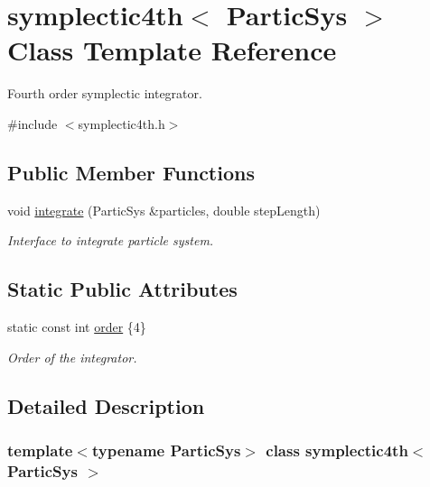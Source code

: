 \hypertarget{classsymplectic4th}{}\section{symplectic4th$<$ Partic\+Sys $>$ Class Template Reference}
\label{classsymplectic4th}


Fourth order symplectic integrator.  




{\ttfamily \#include $<$symplectic4th.\+h$>$}

\subsection*{Public Member Functions}
\begin{DoxyCompactItemize}
\item 
void \mbox{\hyperlink{classsymplectic4th_aa4fc1444804ed2effb0033a3cb5056e4}{integrate}} (Partic\+Sys \&particles, double step\+Length)
\begin{DoxyCompactList}\small\item\em Interface to integrate particle system. \end{DoxyCompactList}\end{DoxyCompactItemize}
\subsection*{Static Public Attributes}
\begin{DoxyCompactItemize}
\item 
static const int \mbox{\hyperlink{classsymplectic4th_a44427b7e9dab1a2241071d1cc639ebe4}{order}} \{4\}
\begin{DoxyCompactList}\small\item\em Order of the integrator. \end{DoxyCompactList}\end{DoxyCompactItemize}


\subsection{Detailed Description}
\subsubsection*{template$<$typename Partic\+Sys$>$\newline
class symplectic4th$<$ Partic\+Sys $>$}

